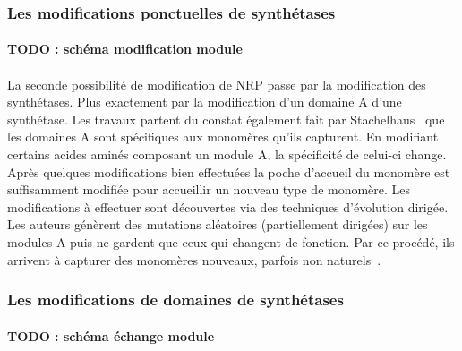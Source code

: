 \documentclass[12pt,french,twoside]{report}
\begin{document}
\subsubsection{Les modifications ponctuelles de synthétases}

\paragraph{TODO : schéma modification module}

\paragraph{}La seconde possibilité de modification de NRP passe par la modification des synthétases.
Plus exactement par la modification d'un domaine A d'une synthétase.
Les travaux \cite{villiers_mapping_2009, kries_reprogramming_2014, williams_engineering_2013} partent du constat également fait par Stachelhaus~\cite{stachelhaus_specificity-conferring_1999} que les domaines A sont spécifiques aux monomères qu'ils capturent.
En modifiant certains acides aminés composant un module A, la spécificité de celui-ci change.
Après quelques modifications bien effectuées la poche d'accueil du monomère est suffisamment modifiée pour accueillir un nouveau type de monomère.
Les modifications à effectuer sont découvertes via des techniques d'évolution dirigée.
Les auteurs génèrent des mutations aléatoires (partiellement dirigées) sur les modules A puis ne gardent que ceux qui changent de fonction.
Par ce procédé, ils arrivent à capturer des monomères nouveaux, parfois non naturels~\cite{thirlway_introduction_2012}.



\subsubsection{Les modifications de domaines de synthétases}

\paragraph{TODO : schéma échange module}
\end{document}
